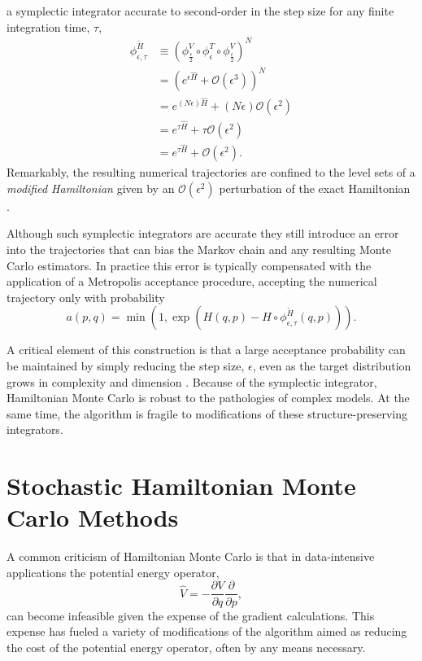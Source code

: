 \documentclass{article}
\begin{document}
a symplectic integrator accurate to second-order in the step size for any finite integration 
time, $\tau$,
%
\begin{align*}
\phi^{\widetilde{H}}_{\epsilon, \tau}
&\equiv
\left( \phi^{V}_{\frac{\epsilon}{2}} \circ 
\phi^{T}_{\epsilon} \circ 
\phi^{V}_{\frac{\epsilon}{2}} \right)^{N}
\\
&=
\left( e^{ \epsilon \hat{H} }
+ \mathcal{O} \! \left( \epsilon^{3} \right) \right)^{N}
\\
&=
e^{ \left( N \epsilon \right) \hat{H} }
+ \left( N \epsilon \right) \mathcal{O} \! \left( \epsilon^{2} \right)
\\
&=
e^{ \tau \hat{H} }
+ \tau \mathcal{O} \! \left( \epsilon^{2} \right)
\\
&=
e^{ \tau \hat{H} }
+ \mathcal{O} \! \left( \epsilon^{2} \right).
\end{align*}
%
Remarkably, the resulting numerical trajectories are confined to the level sets
of a \textit{modified Hamiltonian} given by an $\mathcal{O} \! \left( \epsilon^{2} \right)$
perturbation of the exact Hamiltonian \cite{HairerEtAl:2006, BetancourtEtAl:2014b}.

Although such symplectic integrators are accurate they still introduce an
error into the trajectories that can bias the Markov chain and any resulting
Monte Carlo estimators.  In practice this error is typically compensated with
the application of a Metropolis acceptance procedure, accepting the numerical
trajectory only with probability
%
\begin{equation*}
a (p, q) = \min \left(1, 
\exp \! \left( H (q, p) - H \circ \phi^{\widetilde{H}}_{\epsilon, \tau} (q, p) \right) \right).
\end{equation*}

A critical element of this construction is that a large acceptance probability can be 
maintained by simply reducing the step size, $\epsilon$, even as the target distribution 
grows in complexity and dimension \cite{BetancourtEtAl:2014b}.  Because of the
symplectic integrator, Hamiltonian Monte Carlo is robust to the pathologies of complex 
models.  At the same time, the algorithm is fragile to modifications of these
structure-preserving integrators.

\section{Stochastic Hamiltonian Monte Carlo Methods}

A common criticism of Hamiltonian Monte Carlo is that in data-intensive applications 
the potential energy operator,
%
\begin{equation*}
\hat{V} = - \frac{ \partial V }{ \partial q } \frac{ \partial }{ \partial p},
\end{equation*}
%
can become infeasible given the expense of the gradient calculations.  This expense
has fueled a variety of modifications of the algorithm aimed as reducing the cost of 
the potential energy operator, often by any means necessary.
\end{document}
